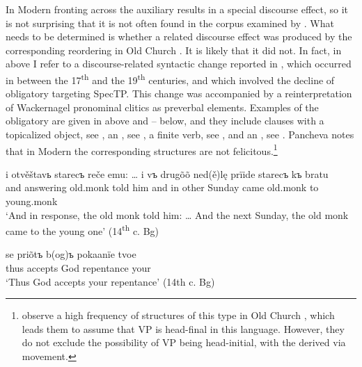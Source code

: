 \documentclass[output=paper,modfonts,newtxmath,hidelinks]{langscibook}
\begin{document}
In Modern   fronting across the  auxiliary results in a special discourse effect, so it is not surprising that it is not often found in the corpus examined by \citeauthor{pancheva2008}. What needs to be determined is whether a related discourse effect was produced by the corresponding  reordering in Old Church . It is likely that it did not. In fact, in  above I refer to a discourse-related syntactic change reported in \citet[153--154]{pancheva2005}, which occurred in  between the 17\textsuperscript{th} and the 19\textsuperscript{th} centuries, and which involved the decline of obligatory  targeting SpecTP. This change was accompanied by a reinterpretation of Wackernagel pronominal clitics as preverbal elements. Examples of the obligatory  are given in  above and -- below, and they include clauses with a topicalized object, see , an  , see , a finite verb, see , and an , see . Pancheva notes that in Modern  the corresponding structures are not felicitous.\footnote{\label{11:fn3}\citet{dimitrovavulchanova-vulchanov2008} observe a high frequency of structures of this type in Old Church , which leads them to assume that VP is head-final in this language. However, they do not exclude the possibility of VP being head-initial, with the  derived via movement.}

\largerpage
\ea \label{11:ex18}
	\gll i otvěštavь starecъ reče emu: {\dots} i vъ drugõõ ned(ě)lę prïide starecъ kъ bratu\\
     and answering old.monk told him {} and in other Sunday came old.monk to young.monk\\
	\glt `And in response, the old monk told him: {\dots} And the next Sunday, the old monk came to the young one' \hfill (14\textsuperscript{th} c. Bg)
\z

\ea \label{11:ex19}
	\gll se priõtъ b(og)ъ pokaanïe tvoe\\
     thus accepts God repentance your \\
	\glt `Thus God accepts your repentance' \hfill (14th c. Bg)
\z
\end{document}
